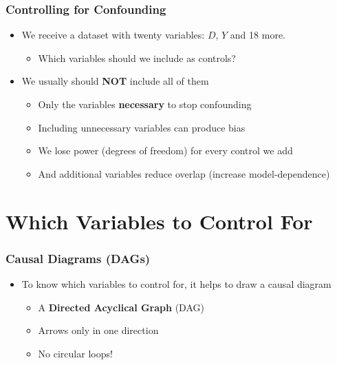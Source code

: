 \documentclass[xcolor=x11names,compress]{beamer}\usepackage[]{graphicx}\usepackage[]{color}
\renewcommand{\(}{\begin{columns}}
\renewcommand{\)}{\end{columns}}
\newcommand{\<}[1]{\begin{column}{#1}}
\renewcommand{\>}{\end{column}}
\begin{document}
\begin{frame}
\frametitle{Controlling for Confounding}
\begin{itemize}
\item We receive a dataset with twenty variables: $D$, $Y$ and 18 more. 
\begin{itemize}
\item Which variables should we include as controls?
\end{itemize}
\pause
\item We usually should \textbf{NOT} include all of them
\pause
\begin{itemize}
\item Only the variables \textbf{necessary} to stop confounding
\pause
\item Including unnecessary variables can produce bias
\pause
\item We lose power (degrees of freedom) for every control we add
\pause
\item And additional variables reduce overlap (increase model-dependence)
\pause
\end{itemize}
\end{itemize}
\end{frame}

\section{Which Variables to Control For}

\begin{frame}
\frametitle{Causal Diagrams (DAGs)}
\begin{itemize}
\item To know which variables to control for, it helps to draw a causal diagram
\pause
\begin{itemize}
\item A \textbf{Directed Acyclical Graph} (DAG)
\pause
\item Arrows only in one direction
\pause
\item No circular loops!
\end{itemize}
\end{itemize}
\end{frame}
\end{document}
